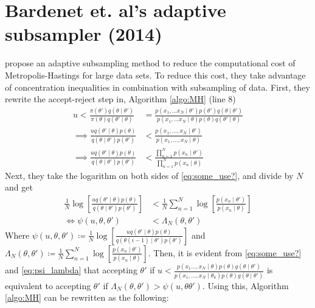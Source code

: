 \section{Bardenet et. al's adaptive subsampler (2014)}\label{sec:conf_sampler}
 \cite{Bardenet:2} propose an adaptive subsampling method to reduce the computational cost of Metropolis-Hastings for large data sets.  
To reduce this cost, they take advantage of concentration inequalities in combination with subsampling of data. 
First, they rewrite the accept-reject step in, Algorithm \ref{algo:MH}  (line 8)  
\begin{equation}\label{eq:some_use?}
\begin{split}
    u < \frac{\pi\left(\theta'\right)q\left(\theta\mid \theta'\right)}{\pi \left(\theta\right)q\left(\theta'\mid \theta\right)} &= \frac{p\left(x_1, \ldots x_N \mid \theta'\right) p\left(\theta'\right)q\left(\theta\mid \theta'\right)}{p\left(x_1, \ldots x_N\mid \theta\right)p\left(\theta\right)q\left(\theta'\mid\theta\right)} \\ 
    \implies \frac{u q\left(\theta'\mid \theta \right)p\left(\theta\right)}{q\left(\theta\mid\theta'\right)p\left(\theta'\right)} &< \frac{p\left(x_1, \ldots, x_N \mid \theta'\right)}{p\left(x_1, \ldots, x_N \mid \theta\right)} \\
    \implies \frac{u q\left(\theta'\mid \theta \right) p\left(\theta\right)}{q\left(\theta \mid \theta'\right) p \left(\theta'\right)} &< \frac{\prod_{n = 1}^N p\left(x_n\mid \theta'\right)}{\prod_{n = 1}^N p\left(x_n \mid \theta\right)}
    \end{split}
\end{equation}
Next, they take the logarithm on both sides of \ref{eq:some_use?}, and divide by $N$ and get
\begin{equation}\label{eq:psi_lambda}
\begin{split}
     \frac{1}{N} \log \left[\frac{u q\left(\theta' \mid \theta\right)p\left(\theta\right)}{q\left(\theta\mid \theta'\right)p\left(\theta'\right)}\right] &< \frac{1}{N} \sum_{n = 1}^N \log \left[\frac{p\left(x_n\mid \theta'\right)}{p\left(x_n \mid \theta\right)}\right] \\
     \iff  \psi\left(u, \theta, \theta'\right) &< \Lambda_N\left(\theta,\theta'\right) 
\end{split}
\end{equation}
Where $\psi\left(u, \theta, \theta'\right)\coloneqq \frac{1}{N}\log\left[\frac{u q\left(\theta'\mid\theta\right)p\left(\theta\right)}{q\left(\theta{(i-1)}\mid \theta'\right)p\left(\theta'\right)}\right]$ and $\Lambda_N\left(\theta, \theta'\right) \coloneqq \frac{1}{N}\sum_{n = 1}^N \log\left[\frac{p\left(x_n\mid \theta'\right)}{p\left(x_n\mid\theta\right)}\right]$. Then, it is evident from \eqref{eq:some_use?} and \eqref{eq:psi_lambda} that accepting $\theta'$ if $u < \frac{p\left(x_1\ldots, x_N\mid \theta\right)p\left(\theta\right)g\left(\theta\mid \theta'\right)}{p\left(x_1, \ldots, x_N\mid \theta_k\right)p\left(\theta\right)g\left(\theta\mid\theta'\right)}$ is equivalent to accepting $\theta'$ if $\Lambda_N\left(\theta, \theta'\right)>\psi\left(u,\theta\theta'\right)$. Using this, Algorithm \ref{algo:MH} can be rewritten as the following:
